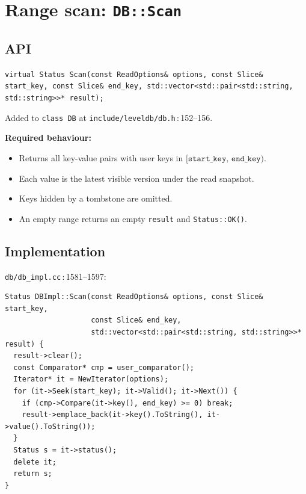\documentclass[11pt,a4paper]{article}
\newcommand{\codref}[2]{\textcolor{accent}{\texttt{\small#1}}\,$\!:\!$\textcolor{primary!70!black}{\small#2}}
\newcommand{\sym}[1]{\texttt{#1}}
\begin{document}
\section{Range scan: \texttt{DB::Scan}}\label{sec:scan}

\subsection{API}

\begin{spec}[Signature]
\sym{virtual Status Scan(const ReadOptions\& options,
                       const Slice\& start\_key,
                       const Slice\& end\_key,
                       std::vector<std::pair<std::string, std::string>>* result);}
\end{spec}

Added to \sym{class DB} at \codref{include/leveldb/db.h}{152--156}.

\textbf{Required behaviour:}
\begin{itemize}[leftmargin=1.4em,itemsep=2pt]
    \item Returns all key-value pairs with user keys in
          $[\sym{start\_key},\,\sym{end\_key})$.
    \item Each value is the latest visible version under the read snapshot.
    \item Keys hidden by a tombstone are omitted.
    \item An empty range returns an empty \sym{result} and \sym{Status::OK()}.
\end{itemize}

\subsection{Implementation}

\codref{db/db\_impl.cc}{1581--1597}:

\begin{lstlisting}
Status DBImpl::Scan(const ReadOptions& options, const Slice& start_key,
                    const Slice& end_key,
                    std::vector<std::pair<std::string, std::string>>* result) {
  result->clear();
  const Comparator* cmp = user_comparator();
  Iterator* it = NewIterator(options);
  for (it->Seek(start_key); it->Valid(); it->Next()) {
    if (cmp->Compare(it->key(), end_key) >= 0) break;
    result->emplace_back(it->key().ToString(), it->value().ToString());
  }
  Status s = it->status();
  delete it;
  return s;
}
\end{lstlisting}
\end{document}
